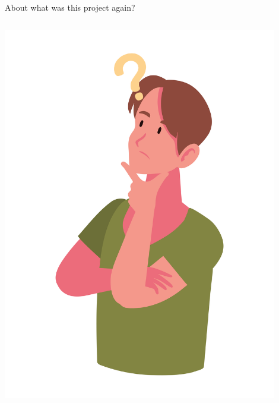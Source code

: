 \documentclass[
    ngerman,%
    authorontitle=true,
]{bfhbeamer}
\begin{document}
    \begin{frame}{About what was this project again?}
  
    	\begin{columns} %
    		\begin{column}{0.3\textwidth} %
	    		\begin{center}
	    			\includegraphics[width=0.9\textwidth]{pictures/final_presentation/thinking1.jpg}
	    		\end{center}
    		\end{column}
    	\end{columns}
    \end{frame}
\end{document}
